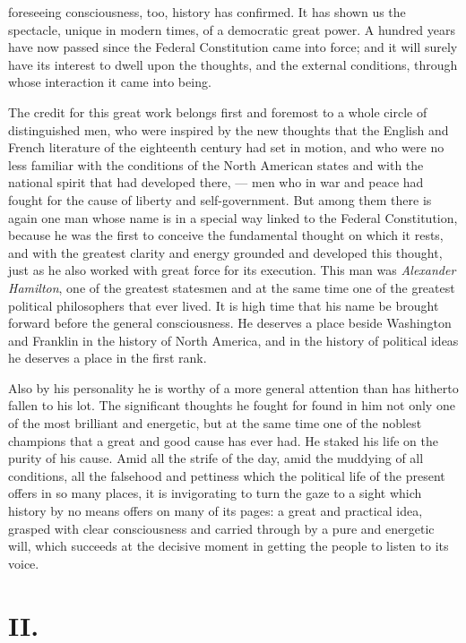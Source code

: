 \documentclass[12pt,a4paper,openany]{book}
\newcommand{\opage}[1]{\marginnote{\footnotesize\textit{[#1]}}}
\begin{document}
foreseeing consciousness, too, history has confirmed. It
has shown us the spectacle, unique in modern times, of a democratic
great power. A hundred years have now passed since
the Federal Constitution came into force; and it will surely have its
interest to dwell upon the thoughts, and the external conditions, through
whose interaction it came into being.

The credit for this great work belongs first and foremost to
a whole circle of distinguished men, who were inspired by
\opage{116}the new thoughts that the English and French literature of the eighteenth century
had set in motion, and who were no less
familiar with the conditions of the North American states and with
the national spirit that had developed there, --- men who
in war and peace had fought for the cause of liberty and self-government.
But among them there is again one man whose name is
in a special way linked to the Federal Constitution, because he
was the first to conceive the fundamental thought on which
it rests, and with the greatest clarity and energy grounded and
developed this thought, just as he also worked with great force
for its execution. This man was \emph{Alexander
Hamilton}, one of the greatest statesmen and at the same time one of the
greatest political philosophers that ever lived. It
is high time that his name be brought forward before the general
consciousness. He deserves a place beside Washington
and Franklin in the history of North America, and in the history of political ideas
he deserves a place in the first rank.

Also by his personality he is worthy of a more
general attention than has hitherto fallen to
his lot. The significant thoughts he fought for found in
him not only one of the most brilliant and energetic, but
at the same time one of the noblest champions that a great
and good cause has ever had. He staked his life on the
purity of his cause. Amid all the strife of the day, amid the muddying of all
conditions, all the falsehood and pettiness which the political
life of the present offers in so many places, it is invigorating to turn
the gaze to a sight which history by no means offers
on many of its pages: a great and practical idea, grasped with
clear consciousness and carried through by a pure and energetic will,
which succeeds at the decisive moment in getting the people to
listen to its voice.

\section*{II.}
\end{document}
